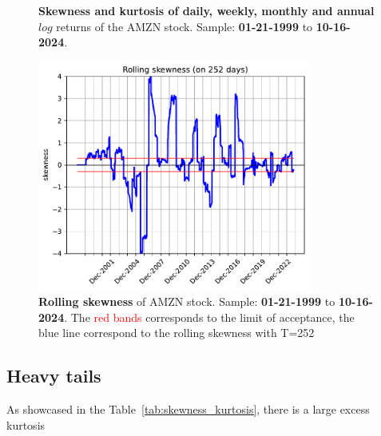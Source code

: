 \documentclass{article}
\begin{document}
\begin{figure}[H]
    \centering
    \begin{minipage}{0.45\textwidth}
        \begin{table}[H]
            \centering
              
            \caption{\textbf{Skewness and kurtosis of daily, weekly, monthly and annual} $log$ returns of the AMZN stock. 
            Sample: \textbf{01-21-1999} to \textbf{10-16-2024}.}
            \label{tab:skewness_kurtosis}
        \end{table}
    \end{minipage}
    \hspace{0.05\textwidth}
    \begin{minipage}{0.45\textwidth}
        \centering
        \includegraphics[width=0.8\textwidth]{Img/Fact3_2_rollskew.pdf}
        \caption{\textbf{Rolling skewness} of AMZN stock. 
        Sample: \textbf{01-21-1999} to \textbf{10-16-2024}. The \textcolor{red}{red bands} corresponds to the limit of acceptance, the blue line correspond to the rolling skewness with T=252}
        \label{fig:Rolling_skewness}
    \end{minipage}
\end{figure}


\subsection{Heavy tails}
\noindent As showcased in the Table~\ref{tab:skewness_kurtosis}, there is a large excess kurtosis
\end{document}

